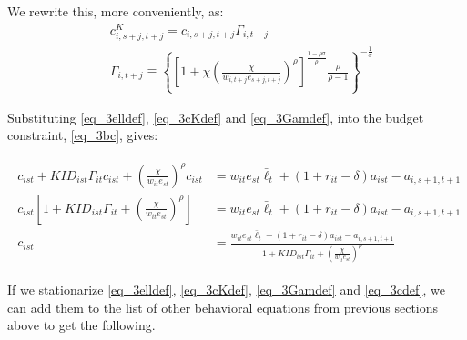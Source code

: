 \documentclass[letterpaper,12pt]{article}
\theoremstyle{definition}
\numberwithin{equation}{section}
\begin{document}
\begin{spacing}{1.5}
	We rewrite this, more conveniently, as:
	\begin{align}
       & c^K_{i,s+j,t+j} = c_{i,s+j,t+j} \Gamma_{i,t+j} \label{eq_3cKdef} \\
       & \Gamma_{i,t+j} \equiv \left\{ \left[1 + \chi \left(\frac{\chi}{w_{i,t+j} e_{s+j,t+j}}\right)^\rho\right]^{\tfrac{1-\rho \sigma}{\rho}} \frac{\rho}{\rho-1} \right\}^{-\tfrac{1}{\sigma}} \label{eq_3Gamdef}
	\end{align}

	Substituting \eqref{eq_3elldef}, \eqref{eq_3cKdef} and \eqref{eq_3Gamdef}, into the budget constraint, \eqref{eq_3bc},  gives:

	\begin{align}
		\begin{split}
		c_{ist} + KID_{ist}\Gamma_{it} c_{ist} + \left(\frac{\chi}{w_{it}e_{st}}\right)^\rho c_{ist} & = w_{it} e_{st} \bar \ell_t + (1+r_{it}-\delta)a_{ist} - a_{i,s+1,t+1} \\
		c_{ist} \left[ 1 + KID_{ist}\Gamma_{it} + \left(\frac{\chi}{w_{it}e_{st}}\right)^\rho \right] & = w_{it} e_{st} \bar \ell_t + (1+r_{it}-\delta)a_{ist} - a_{i,s+1,t+1} \\
		c_{ist} & = \frac{w_{it} e_{st} \bar \ell_t + (1+r_{it}-\delta)a_{ist} - a_{i,s+1,t+1}} {1 + KID_{ist}\Gamma_{it} + \left(\tfrac{\chi}{w_{it}e_{st}}\right)^\rho} \label{eq_3cdef}
        \end{split}
	\end{align}

	If we stationarize \eqref{eq_3elldef}, \eqref{eq_3cKdef}, \eqref{eq_3Gamdef} and \eqref{eq_3cdef}, we can add them to the list of other behavioral equations from previous sections above to get the following.


\end{spacing}
\end{document}
